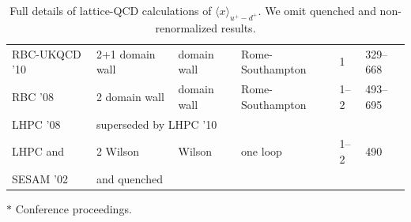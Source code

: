 \begin{table}[!t]
\begin{threeparttable}
\begin{tabular}{llllll}
  RBC-UKQCD '10 \cite{Aoki:2010xg} &
  2+1 domain wall & domain wall & Rome-Southampton & 1 & 329--668 \\

  RBC '08 \cite{Lin:2008uz} &
  2 domain wall & domain wall & Rome-Southampton & 1--2 & 493--695 \\

  LHPC '08 \cite{Hagler:2007xi} &
  \multicolumn{5}{l}{superseded by LHPC '10} \\

  LHPC and &
  2 Wilson & Wilson & one loop & 1--2 & 490\\
  SESAM '02 \cite{Dolgov:2002zm} &
  and quenched & & & \\
\bottomrule
\end{tabular}
\begin{tablenotes}
\scriptsize
\item[$*$] Conference proceedings.
\end{tablenotes}
\end{threeparttable}
\caption{\small Full details of lattice-QCD calculations of 
$\langle x\rangle_{u^+-d^+}$. We omit quenched and non-renormalized results.}
\label{tab:unpolarizedisotriplet}
\end{table}

